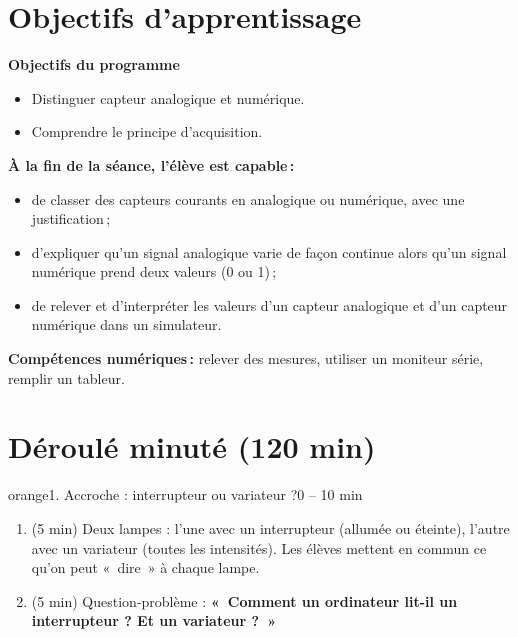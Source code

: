 \documentclass[11pt,a4paper]{article}
\begin{document}
\section{Objectifs d'apprentissage}
\begin{tcolorbox}[colback=gray!8,colframe=gray!60!black,arc=1mm,boxrule=0.5pt]
\textbf{Objectifs du programme}
\begin{itemize}
 \item Distinguer capteur analogique et numérique.
 \item Comprendre le principe d'acquisition.
\end{itemize}
\textbf{À la fin de la séance, l'élève est capable\,:}
\begin{itemize}
 \item de classer des capteurs courants en analogique ou numérique, avec une justification\,;
 \item d'expliquer qu'un signal analogique varie de façon continue alors qu'un signal numérique prend deux valeurs (0 ou 1)\,;
 \item de relever et d'interpréter les valeurs d'un capteur analogique et d'un capteur numérique dans un simulateur.
\end{itemize}
\textbf{Compétences numériques\,:} relever des mesures, utiliser un moniteur série, remplir un tableur.
\end{tcolorbox}

\section{Déroulé minuté (120 min)}

\begin{etape}{orange}{1. Accroche : interrupteur ou variateur ?}{0 -- 10 min}
\begin{enumerate}
 \item (5 min) Deux lampes : l'une avec un interrupteur (allumée ou éteinte), l'autre avec un variateur (toutes les intensités). Les élèves mettent en commun ce qu'on peut «~dire~» à chaque lampe.
 \item (5 min) Question-problème : \textbf{«~Comment un ordinateur lit-il un interrupteur ? Et un variateur ?~»}
\end{enumerate}
\end{etape}
\end{document}
